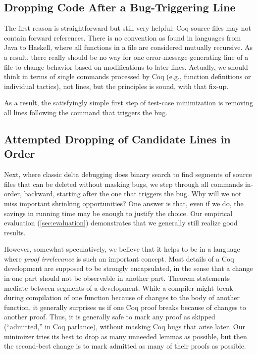 \documentclass[a4paper,USenglish,cleveref,autoref,thm-restate]{lipics-v2021}
\begin{document}
\subsection{Dropping Code After a Bug-Triggering Line}

The first reason is straightforward but still very helpful: Coq source files may not contain forward references.
There is no convention as found in languages from Java to Haskell, where all functions in a file are considered mutually recursive.
As a result, there really should be no way for one error-message-generating line of a file to change behavior based on modifications to later lines.
Actually, we should think in terms of single commands processed by Coq (e.g., function definitions or individual tactics), not lines, but the principles is sound, with that fix-up.

As a result, the satisfyingly simple first step of test-case minimization is removing all lines following the command that triggers the bug.

\subsection{Attempted Dropping of Candidate Lines in Order}

Next, where classic delta debugging does binary search to find segments of source files that can be deleted without masking bugs, we step through all commands in-order, backward, starting after the one that triggers the bug.
Why will we not miss important shrinking opportunities?
One answer is that, even if we do, the savings in running time may be enough to justify the choice.
Our empirical evaluation (\autoref{sec:evaluation}) demonstrates that we generally still realize good results.

However, somewhat speculatively, we believe that it helps to be in a language where \emph{proof irrelevance} is such an important concept.
Most details of a Coq development are supposed to be strongly encapsulated, in the sense that a change in one part should not be observable in another part.
Theorem statements mediate between segments of a development.
While a compiler might break during compilation of one function because of changes to the body of another function, it generally surprises us if one Coq proof breaks because of changes to another proof.
Thus, it is generally safe to mark any proof as skipped (``admitted,'' in Coq parlance), without masking Coq bugs that arise later.
Our minimizer tries its best to drop as many unneeded lemmas as possible, but then the second-best change is to mark admitted as many of their proofs as possible.
\end{document}
